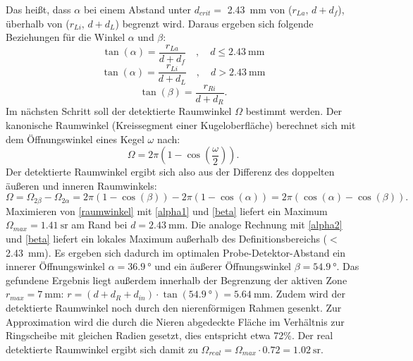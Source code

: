 Das heißt, dass $\alpha$ bei einem Abstand unter $d_{crit} =$ \SI{2.43}{\milli\meter} von ($r_{La},\,d+d_{f}$), überhalb von ($r_{Li},\,d+d_{L}$) begrenzt wird. Daraus ergeben sich folgende Beziehungen für die Winkel $\alpha$ und $\beta$:
\begin{equation} \label{alpha1}
\tan(\alpha) = \frac{r_{La}}{d+d_f} \quad,\quad d \leq \SI{2.43}{\milli\meter}
\end{equation}
\begin{equation} \label{alpha2}
\tan(\alpha) = \frac{r_{Li}}{d+d_L} \quad,\quad d > \SI{2.43}{\milli\meter}
\end{equation}
\begin{equation} \label{beta}
\tan(\beta) = \frac{r_{Ri}}{d+d_R}.
\end{equation}
Im nächsten Schritt soll der detektierte Raumwinkel $\Omega$ bestimmt werden. Der kanonische Raumwinkel (Kreissegment einer Kugeloberfläche) berechnet sich mit dem Öffnungswinkel eines Kegel $\omega$ nach: 
\begin{equation}
\Omega = 2 \pi (1-\cos(\frac{\omega}{2})).
\end{equation}
Der detektierte Raumwinkel ergibt sich also aus der Differenz des doppelten äußeren und inneren Raumwinkels:
\begin{equation} \label{raumwinkel}
\Omega = \Omega_{2\beta}-\Omega_{2\alpha} = 2 \pi (1-\cos(\beta)) - 2 \pi (1-\cos(\alpha)) = 2 \pi (\cos(\alpha) - \cos(\beta)).
\end{equation} %
Maximieren von \cref{raumwinkel} mit \cref{alpha1} und \cref{beta} liefert ein Maximum $\Omega_{max} = \SI{1.41}{\steradian}$ am Rand bei $d = \SI{2.43}{\milli\meter}$. Die analoge Rechnung mit \cref{alpha2} und \cref{beta} liefert ein lokales Maximum außerhalb des Definitionsbereichs ($<$\SI{2.43}{\milli\meter}).\newlines
Es ergeben sich dadurch im optimalen Probe-Detektor-Abstand ein innerer Öffnungswinkel $\alpha = \SI{36.9}{\degree}$ und ein äußerer Öffnungswinkel $\beta = \SI{54.9}{\degree}$. \newline Das gefundene Ergebnis liegt außerdem innerhalb der Begrenzung der aktiven Zone $r_{max}=\SI{7}{\milli\meter}$: $r = (d+d_R+d_{in})\cdot \tan(\SI{54.9}{\degree}) = \SI{5.64}{\milli\meter}$. \newline
Zudem wird der detektierte Raumwinkel noch durch den nierenförmigen Rahmen gesenkt. Zur Approximation wird die durch die Nieren abgedeckte Fläche im Verhältnis zur Ringscheibe mit gleichen Radien gesetzt, dies entspricht etwa 72\%. Der real detektierte Raumwinkel ergibt sich damit zu $\Omega_{real} = \Omega_{max} \cdot 0.72 = \SI{1.02}{\steradian}$.
